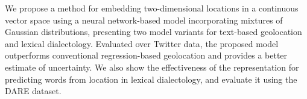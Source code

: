 We propose a method for embedding two-dimensional locations in a continuous vector space using a neural network-based model incorporating mixtures of Gaussian distributions, presenting two model variants for text-based geolocation and lexical dialectology. Evaluated over Twitter data, the proposed model outperforms conventional regression-based geolocation and provides a better estimate of uncertainty. We also show the effectiveness of the representation for predicting words from location in lexical dialectology, and evaluate it using the DARE dataset.
